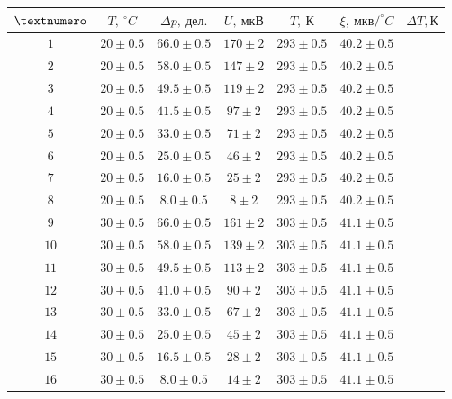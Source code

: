 \begin{tabular}{|c|c|c|c|c|c|c|}
  \hline
  $\textnumero$ & $T,\ ^\circ C$ & $\Delta p,\ дел.$ & $U,\ мкВ$ & $T,\ К$ & $\xi,\ мкв/^\circ C$ & $\Delta T, К$\\ \hline
  $1$ & $20 \pm 0.5$ & $66.0 \pm 0.5$ & $170 \pm 2$ & $293 \pm 0.5$ & $40.2 \pm 0.5$ & $ $\\ \hline
  $2$ & $20 \pm 0.5$ & $58.0 \pm 0.5$ & $147 \pm 2$ & $293 \pm 0.5$ & $40.2 \pm 0.5$ & $ $\\ \hline
  $3$ & $20 \pm 0.5$ & $49.5 \pm 0.5$ & $119 \pm 2$ & $293 \pm 0.5$ & $40.2 \pm 0.5$ & $ $\\ \hline
  $4$ & $20 \pm 0.5$ & $41.5 \pm 0.5$ & $97 \pm 2$ & $293 \pm 0.5$ & $40.2 \pm 0.5$ & $ $\\ \hline
  $5$ & $20 \pm 0.5$ & $33.0 \pm 0.5$ & $71 \pm 2$ & $293 \pm 0.5$ & $40.2 \pm 0.5$ & $ $\\ \hline
  $6$ & $20 \pm 0.5$ & $25.0 \pm 0.5$ & $46 \pm 2$ & $293 \pm 0.5$ & $40.2 \pm 0.5$ & $ $\\ \hline
  $7$ & $20 \pm 0.5$ & $16.0 \pm 0.5$ & $25 \pm 2$ & $293 \pm 0.5$ & $40.2 \pm 0.5$ & $ $\\ \hline
  $8$ & $20 \pm 0.5$ & $8.0 \pm 0.5$ & $8 \pm 2$ & $293 \pm 0.5$ & $40.2 \pm 0.5$ & $ $\\ \hline

  $9$ & $30 \pm 0.5$ & $66.0 \pm 0.5$ & $161 \pm 2$ & $303 \pm 0.5$ & $41.1 \pm 0.5$ & $ $\\ \hline
  $10$ & $30 \pm 0.5$ & $58.0 \pm 0.5$ & $139 \pm 2$ & $303 \pm 0.5$ & $41.1 \pm 0.5$ & $ $\\ \hline
  $11$ & $30 \pm 0.5$ & $49.5 \pm 0.5$ & $113 \pm 2$ & $303 \pm 0.5$ & $41.1 \pm 0.5$ & $ $\\ \hline
  $12$ & $30 \pm 0.5$ & $41.0 \pm 0.5$ & $90 \pm 2$ & $303 \pm 0.5$ & $41.1 \pm 0.5$ & $ $\\ \hline
  $13$ & $30 \pm 0.5$ & $33.0 \pm 0.5$ & $67 \pm 2$ & $303 \pm 0.5$ & $41.1 \pm 0.5$ & $ $\\ \hline
  $14$ & $30 \pm 0.5$ & $25.0 \pm 0.5$ & $45 \pm 2$ & $303 \pm 0.5$ & $41.1 \pm 0.5$ & $ $\\ \hline
  $15$ & $30 \pm 0.5$ & $16.5 \pm 0.5$ & $28 \pm 2$ & $303 \pm 0.5$ & $41.1 \pm 0.5$ & $ $\\ \hline
  $16$ & $30 \pm 0.5$ & $8.0 \pm 0.5$ & $14 \pm 2$ & $303 \pm 0.5$ & $41.1 \pm 0.5$ & $ $\\ \hline


\end{tabular}
